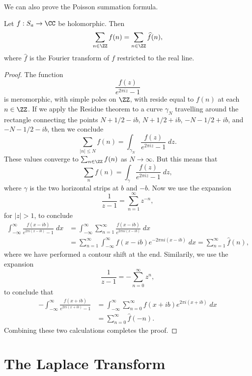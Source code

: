 We can also prove the Poisson summation formula.

\begin{theorem}
    Let $f: S_a \to \CC$ be holomorphic. Then
    \[ \sum_{n \in \ZZ} f(n) = \sum_{n \in \ZZ} \widehat{f}(n), \]
    where $\widehat{f}$ is the Fourier transform of $f$ restricted to the real line.
\end{theorem}
\begin{proof}
    The function
    \[ \frac{f(z)}{e^{2 \pi i z} - 1} \]
    is meromorphic, with simple poles on $\ZZ$, with reside equal to $f(n)$ at each $n \in \ZZ$. If we apply the Residue theorem to a curve $\gamma_N$ travelling around the rectangle connecting the points $N+1/2-ib$, $N+1/2+ib$, $-N-1/2+ib$, and $-N-1/2-ib$, then we conclude
    \[ \sum_{|n| \leq N} f(n) = \int_{\gamma_N} \frac{f(z)}{e^{2 \pi i z} - 1}\; dz. \]
    These values converge to $\sum_{n \in \ZZ} f(n)$ as $N \to \infty$. But this means that
    \[ \sum_n f(n) = \int_\gamma \frac{f(z)}{e^{2 \pi i z} - 1}\; dz, \]
    where $\gamma$ is the two horizontal strips at $b$ and $-b$. Now we use the expansion
    \[ \frac{1}{z - 1} = \sum_{n = 1}^\infty z^{-n}, \]
    for $|z| > 1$, to conclude
    \begin{align*}
        \int_{-\infty}^\infty \frac{f(x - ib)}{e^{2 \pi i (x - ib)} - 1}\; dx &= \int_{-\infty}^\infty \sum_{n = 1}^\infty \frac{f(x - ib)}{e^{2 \pi n i (x - ib)}}\; dx\\
        &= \sum_{n = 1}^\infty \int_{-\infty}^\infty f(x - ib) e^{-2 \pi n i (x - ib)}\; dx = \sum_{n = 1}^\infty \widehat{f}(n),
    \end{align*}
    where we have performed a contour shift at the end. Similarily, we use the expansion
    \[ \frac{1}{z - 1} = - \sum_{n = 0}^\infty z^n, \]
    to conclude that
    \begin{align*}
        - \int_{-\infty}^\infty \frac{f(x + ib)}{e^{2 \pi i (x + ib)} - 1} &= \int_{-\infty}^\infty \sum_{n = 0}^\infty f(x + ib) e^{2 \pi i (x + ib)}\; dx\\
        &= \sum_{n = 0}^\infty \widehat{f}(-n).
    \end{align*}
    Combining these two calculations completes the proof.
\end{proof}

\section{The Laplace Transform}

